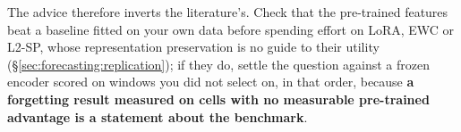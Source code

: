 The advice therefore inverts the literature's.  Check that
the pre-trained features beat a baseline fitted on your own data before spending
effort on LoRA, EWC or L2-SP, whose representation preservation is no guide to
their utility (\S\ref{sec:forecasting:replication}); if they do, settle the question against a frozen
encoder scored on windows you did not select on, in that order, because
\textbf{a forgetting result measured on cells with no measurable pre-trained
advantage is a statement about the benchmark}.
%
